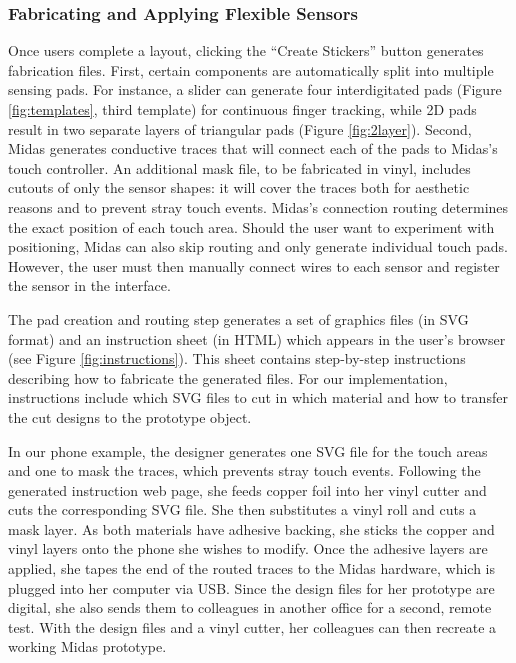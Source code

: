         \subsubsection{Fabricating and Applying Flexible Sensors}
Once users complete a layout, clicking the ``Create Stickers''
button generates fabrication files. First, certain components
are automatically split into multiple sensing pads. For instance,
a slider can generate four interdigitated pads (Figure \ref{fig:templates}, third template) for continuous finger tracking, while
2D pads result in two separate layers of triangular pads (Figure
\ref{fig:2layer}). Second, Midas generates conductive traces that will
connect each of the pads to Midas's touch controller. An additional mask file, to be fabricated in vinyl, includes cutouts
of only the sensor shapes: it will cover the traces both for aesthetic
reasons and to prevent stray touch events. Midas's connection
routing determines the exact position of each touch
area. Should the user want to experiment with positioning,
Midas can also skip routing and only generate individual
touch pads. However, the user must then manually connect
wires to each sensor and register the sensor in the interface.

The pad creation and routing step generates a set of graphics
files (in SVG format) and an instruction sheet (in HTML)
which appears in the user's browser (see Figure \ref{fig:instructions}). This sheet
contains step-by-step instructions describing how to fabricate
the generated files. For our implementation, instructions include
which SVG files to cut in which material and how to
transfer the cut designs to the prototype object.

In our phone example, the designer generates one SVG file
for the touch areas and one to mask the traces, which prevents
stray touch events. Following the generated instruction
web page, she feeds copper foil into her vinyl cutter and cuts
the corresponding SVG file. She then substitutes a vinyl roll
and cuts a mask layer. As both materials have adhesive backing,
she sticks the copper and vinyl layers onto the phone
she wishes to modify. Once the adhesive layers are applied,
she tapes the end of the routed traces to the Midas hardware,
which is plugged into her computer via USB. Since the design
files for her prototype are digital, she also sends them to
colleagues in another office for a second, remote test. With
the design files and a vinyl cutter, her colleagues can then
recreate a working Midas prototype.

